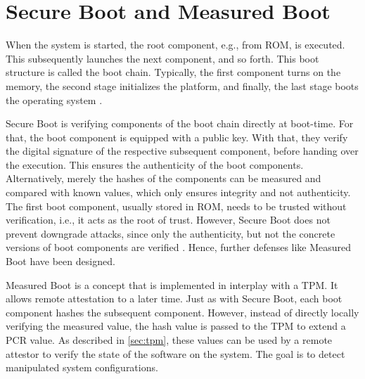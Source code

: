 \section{Secure Boot and Measured Boot}

When the system is started, the root component, e.g., from ROM, is executed. This subsequently launches the next component, and so forth. This boot structure is called the boot chain. Typically, the first component turns on the memory, the second stage initializes the platform, and finally, the last stage boots the operating system \cite{Yao2020}.

Secure Boot \cite{Hendricks2004, UEFI, Frazelle2020} is verifying components of the boot chain directly at boot-time. For that, the boot component is equipped with a public key. With that, they verify the digital signature of the respective subsequent component, before handing over the execution. This ensures the authenticity of the boot components. Alternatively, merely the hashes of the components can be measured and compared with known values, which only ensures integrity and not authenticity. The first boot component, usually stored in ROM, needs to be trusted without verification, i.e., it acts as the root of trust. However, Secure Boot does not prevent downgrade attacks, since only the authenticity, but not the concrete versions of boot components are verified \cite{272306}. Hence, further defenses like Measured Boot have been designed.


Measured Boot \cite{tcgMeasuredBoot} is a concept that is implemented in interplay with a TPM. It allows remote attestation to a later time. Just as with Secure Boot, each boot component hashes the subsequent component. However, instead of directly locally verifying the measured value, the hash value is passed to the TPM to extend a \ac{PCR} value. As described in \autoref{sec:tpm}, these values can be used by a remote attestor to verify the state of the software on the system. The goal is to detect manipulated system configurations.

